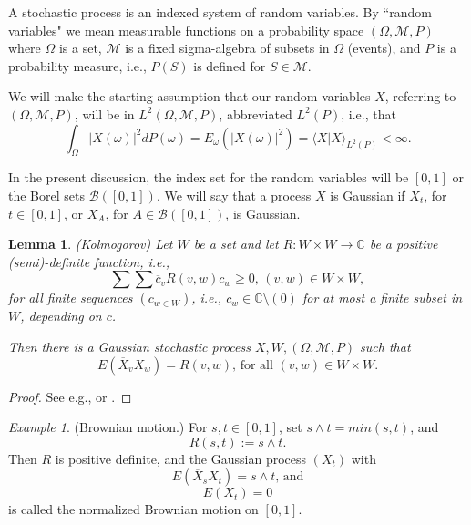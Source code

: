 \documentclass{birkmult}
\newtheorem{lem}[thm]{Lemma}
\theoremstyle{definition}
\theoremstyle{remark}
\newtheorem*{ex}{Example}
\numberwithin{equation}{section}
\begin{document}
A stochastic process is an indexed system of random variables. By ``random 
variables" we mean measurable functions on a probability space 
$(\Omega, \mathcal{M}, P)$ where $\Omega$ is a set, $\mathcal{M}$ is a fixed 
sigma-algebra of subsets in $\Omega$ (events), and $P$ is a probability 
measure, i.e., $P(S)$ is defined for $S \in \mathcal{M}$.

We will make the starting assumption that our random variables $X$, 
referring to $(\Omega, \mathcal{M}, P)$, will be in 
$L^{2}(\Omega, \mathcal{M}, P)$, abbreviated $L^{2}(P)$, i.e., that 
\begin{equation}
\label{E:5.1}
  \int_{\Omega} |X(\omega)|^{2}dP(\omega) = E_{\omega}(|X(\omega)|^{2})
  = \langle X | X \rangle_{L^{2}(P)} < \infty.
\end{equation}

In the present discussion, the index set for the random variables will be 
$[0,1]$ or the Borel sets $\mathcal{B}([0,1])$.  We will say that a process 
$X$ is Gaussian if $X_{t}$, for $t \in [0,1]$, or $X_{A}$, for 
$A \in \mathcal{B}([0,1])$, is Gaussian.

\begin{lem}
\label{L:5.1}
(Kolmogorov) Let $W$ be a set and let $R : W \times W \to \mathbb{C}$ be a 
\textit{positive (semi)-definite} function, i.e., 
\begin{equation}
\label{E:5.2}
  \sum \sum \overline{c}_{v}R(v,w)c_{w} \geq 0 \text{,     } (v,w) 
  \in W \times W,
\end{equation}
for all finite sequences $(c_{w \in W})$, i.e., 
$c_{w} \in \mathbb{C} \setminus (0)$ for at most a finite subset in 
$W$, depending on $c$.

Then there is a Gaussian stochastic process $X, W, (\Omega, \mathcal{M}, P)$ 
such that 
\begin{equation}
\label{E:5.3}
  E(\overline{X}_{v}X_{w}) = R(v,w) \text{, for all } (v,w) \in W \times W.
\end{equation}
\end{lem}
\begin{proof}
See e.g., \cite{Jor06} or \cite{Nel69}.
\end{proof}

\begin{ex}
\label{ex:5.2}
(Brownian motion.) For $s, t \in [0,1]$, set $s \wedge t = min(s,t)$, and 
\begin{equation}
\label{E:5.4}
  R(s,t) := s \wedge t.
\end{equation}
Then $R$ is positive definite, and the Gaussian process $(X_{t})$ with 
\begin{equation}
\label{E:5.5}
  E(\overline{X}_{s}X_{t}) = s \wedge t \text{, and}
\end{equation}
\begin{equation}
\label{E:5.6}
  E(X_{t}) = 0
\end{equation}
is called the normalized Brownian motion on $[0,1]$.
\end{ex}
\end{document}

